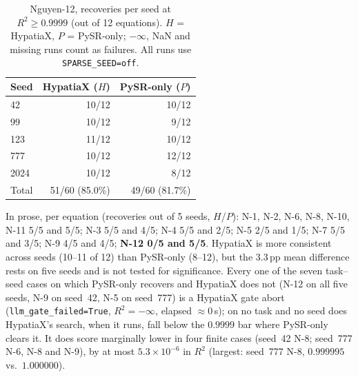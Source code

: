 \documentclass[twoside,11pt]{article}
\newcommand{\Rsq}{R^{2}}
\begin{document}
\begin{table}[h]
\centering
\caption{Nguyen-12, recoveries per seed at $\Rsq\ge0.9999$ (out of 12 equations). $H$ = HypatiaX, $P$ = PySR-only; $-\infty$, NaN and missing runs count as failures. All runs use \texttt{SPARSE\_SEED=off}.}
\label{tab:nguyen12_fiveseed}
\begin{tabular}{lrr}
\toprule
Seed & HypatiaX ($H$) & PySR-only ($P$) \\
\midrule
42 & 10/12 & 10/12 \\
99 & 10/12 & 9/12 \\
123 & 11/12 & 10/12 \\
777 & 10/12 & 12/12 \\
2024 & 10/12 & 8/12 \\
\midrule
Total & 51/60 (85.0\%) & 49/60 (81.7\%) \\
\bottomrule
\end{tabular}
\end{table}


In prose, per equation (recoveries out of 5 seeds, $H$/$P$): N-1, N-2, N-6, N-8, N-10, N-11
5/5 and 5/5; N-3 5/5 and 4/5; N-4 5/5 and 2/5; N-5 2/5 and 1/5; N-7 5/5 and 3/5;
N-9 4/5 and 4/5; \textbf{N-12 0/5 and 5/5}. HypatiaX is more consistent across
seeds (10--11 of 12) than PySR-only (8--12), but the 3.3\,pp mean difference
rests on five seeds and is not tested for significance. Every one of the seven task--seed cases on which
PySR-only recovers and HypatiaX does not (N-12 on all five seeds, N-9 on seed~42, N-5 on seed~777) is a HypatiaX gate abort (\texttt{llm\_gate\_failed=True},
$\Rsq=-\infty$, elapsed $\approx0$\,s); on no task and no seed does HypatiaX's search,
when it runs, fall below the $0.9999$ bar where PySR-only clears it. It does score marginally lower in four finite
cases (seed~42 N-8; seed~777 N-6, N-8 and N-9), by at most $5.3\times10^{-6}$ in $\Rsq$ (largest: seed~777 N-8,
$0.999995$ vs.\ $1.000000$).
\end{document}
